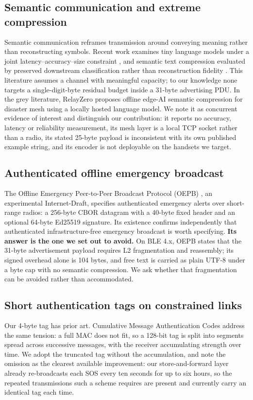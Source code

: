 \documentclass[conference]{IEEEtran}
\begin{document}
\subsection{Semantic communication and extreme compression}
Semantic communication reframes transmission around conveying meaning rather
than reconstructing symbols. Recent work examines tiny language models under a
joint latency--accuracy--size constraint \cite{tlm6g}, and semantic text
compression evaluated by preserved downstream classification rather than
reconstruction fidelity \cite{semcomp}. This literature assumes a channel with
meaningful capacity; to our knowledge none targets a single-digit-byte residual
budget inside a 31-byte advertising PDU. In the grey literature, RelayZero
\cite{relayzero} proposes offline edge-AI semantic compression for disaster
mesh using a locally hosted language model. We note it as concurrent evidence
of interest and distinguish our contribution: it reports no accuracy, latency
or reliability measurement, its mesh layer is a local TCP socket rather than a
radio, its stated 25-byte payload is inconsistent with its own published
example string, and its encoder is not deployable on the handsets we target.

\subsection{Authenticated offline emergency broadcast}
The Offline Emergency Peer-to-Peer Broadcast Protocol (OEPB) \cite{oepb}, an
experimental Internet-Draft, specifies authenticated emergency alerts over
short-range radios: a 256-byte CBOR datagram with a 40-byte fixed header and an
optional 64-byte Ed25519 signature. Its existence confirms independently that
authenticated infrastructure-free emergency broadcast is worth specifying.
\textbf{Its answer is the one we set out to avoid.} On BLE 4.x, OEPB states
that the 31-byte advertisement payload requires L2 fragmentation and
reassembly; its signed overhead alone is 104 bytes, and free text is carried as
plain UTF-8 under a byte cap with no semantic compression. We ask whether that
fragmentation can be avoided rather than accommodated.

\subsection{Short authentication tags on constrained links}
Our 4-byte tag has prior art. Cumulative Message Authentication Codes
\cite{cumac} address the same tension: a full MAC does not fit, so a 128-bit
tag is split into segments spread across successive messages, with the receiver
accumulating strength over time. We adopt the truncated tag without the
accumulation, and note the omission as the clearest available improvement: our
store-and-forward layer already re-broadcasts each SOS every ten seconds for up
to six hours, so the repeated transmissions such a scheme requires are present
and currently carry an identical tag each time.
\end{document}
